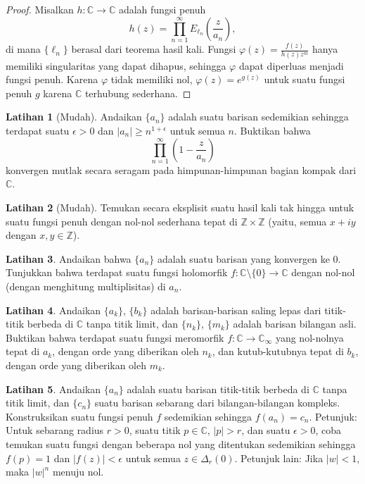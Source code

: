 \documentclass[12pt,openany]{book}
\newcommand{\sabs}[1]{\lvert {#1} \rvert}
\newcommand{\C}{{\mathbb{C}}}
\newcommand{\Z}{{\mathbb{Z}}}
\theoremstyle{plain}
\theoremstyle{remark}
\theoremstyle{definition}
\newenvironment{exbox}{%
    \def\FrameCommand{\vrule width 1pt \relax\hspace{10pt}}%
    \MakeFramed{\advance\hsize-\width\FrameRestore}%
}{%
    \endMakeFramed
}
\theoremstyle{exercise}
\newtheorem{exercise}{Latihan}[section]
\theoremstyle{example}
\begin{document}
\begin{proof}
Misalkan $h \colon \C \to \C$ adalah fungsi penuh
\begin{equation*}
h(z) = \prod_{n=1}^\infty E_{\ell_n}\left(\frac{z}{a_n}\right) ,
\end{equation*}
di mana $\{ \ell_n \}$ berasal dari teorema hasil kali.  Fungsi
$\varphi(z) = \frac{f(z)}{h(z)z^m}$
hanya memiliki singularitas yang dapat dihapus, sehingga $\varphi$ dapat diperluas menjadi fungsi penuh.
Karena $\varphi$ tidak memiliki nol, $\varphi(z) =
e^{g(z)}$ untuk suatu fungsi penuh $g$ karena $\C$ terhubung sederhana.
\end{proof}

\begin{exbox}
\begin{exercise}[Mudah]
Andaikan $\{ a_n \}$ adalah suatu barisan sedemikian sehingga terdapat suatu $\epsilon>0$ dan
$\sabs{a_n} \geq n^{1+\epsilon}$ untuk semua $n$.  Buktikan bahwa
\begin{equation*}
\prod_{n=1}^\infty
\left(1-\frac{z}{a_n} \right)
\end{equation*}
konvergen mutlak secara seragam pada himpunan-himpunan bagian kompak dari $\C$.
\end{exercise}

\begin{exercise}[Mudah]
Temukan secara eksplisit suatu hasil kali tak hingga untuk suatu fungsi penuh
dengan nol-nol sederhana tepat di $\Z \times \Z$ (yaitu,
semua $x + iy$ dengan $x,y \in \Z$).
\end{exercise}

\begin{exercise}
Andaikan bahwa $\{ a_n \}$ adalah suatu barisan yang konvergen ke $0$.  Tunjukkan bahwa terdapat
suatu fungsi holomorfik $f \colon \C \setminus \{ 0 \} \to \C$
dengan nol-nol (dengan menghitung multiplisitas) di $a_n$.
\end{exercise}

\begin{exercise}
Andaikan $\{ a_k \}$, $\{ b_k \}$ adalah
barisan-barisan saling lepas dari titik-titik berbeda di $\C$
tanpa titik limit, dan $\{ n_k \}$, $\{ m_k \}$ adalah barisan
bilangan asli.
Buktikan bahwa
terdapat suatu fungsi meromorfik $f \colon \C \to \C_\infty$ yang
nol-nolnya tepat di $a_k$, dengan orde yang diberikan oleh $n_k$, dan
kutub-kutubnya tepat di $b_k$, dengan orde yang diberikan oleh $m_k$.
\end{exercise}

\begin{exercise}
Andaikan $\{ a_n \}$ adalah suatu barisan titik-titik berbeda di $\C$
tanpa titik limit, dan $\{ c_n \}$ suatu barisan sebarang dari bilangan-bilangan
kompleks.  Konstruksikan suatu fungsi penuh $f$ sedemikian sehingga $f(a_n) = c_n$.
Petunjuk:  Untuk sebarang radius $r > 0$, suatu titik $p \in \C$, $\sabs{p} > r$, dan
suatu $\epsilon > 0$, coba temukan suatu fungsi dengan beberapa nol yang ditentukan
sedemikian sehingga $f(p) =1$ dan $\sabs{f(z)} < \epsilon$ untuk semua $z \in \Delta_r(0)$.
Petunjuk lain:
Jika $\sabs{w} < 1$, maka $\sabs{w}^n$ menuju nol.
\end{exercise}
\end{exbox}
\end{document}
